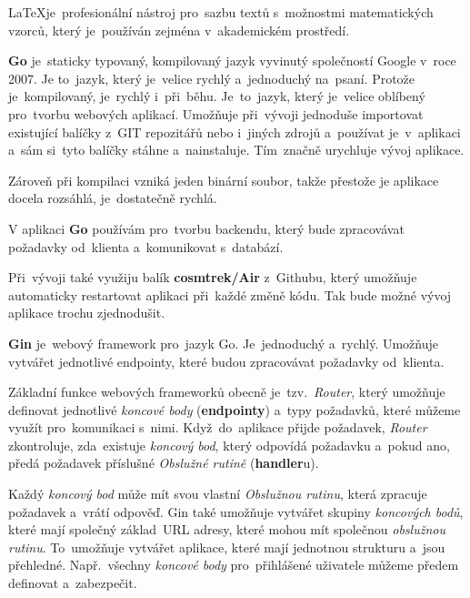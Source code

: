 \documentclass[14pt]{article}
\begin{document}
            \LaTeX je~profesionální nástroj pro~sazbu textů s~možnostmi matematických vzorců, který je~používán zejména v~akademickém prostředí.\parencite{Rybicka2003:latex}

            \textbf{Go} je~staticky typovaný, kompilovaný jazyk vyvinutý společností Google v~roce 2007. Je to~jazyk, který je~velice rychlý a~jednoduchý na~psaní.
            Protože je~kompilovaný, je~rychlý i~při~běhu. Je~to~jazyk, který je~velice oblíbený pro~tvorbu webových aplikací.
            Umožňuje při~vývoji jednoduše importovat existující balíčky z~GIT repozitářů nebo i~jiných zdrojů a~používat je~v~aplikaci a~sám
            si~tyto balíčky stáhne a~nainstaluje. Tím~značně urychluje vývoj aplikace.

            Zároveň při kompilaci vzniká jeden binární soubor, takže přestože je aplikace docela rozsáhlá, je~dostatečně rychlá.
            
            V aplikaci \textbf{Go} používám pro~tvorbu backendu, který bude zpracovávat požadavky od~klienta a~komunikovat s~databází.

            Při~vývoji také využiju balík \textbf{cosmtrek/Air} z~Githubu, který umožňuje automaticky restartovat aplikaci při~každé změně kódu.
            Tak bude možné vývoj aplikace trochu zjednodušit.

            \textbf{Gin} je~webový framework pro~jazyk Go. Je~jednoduchý a~rychlý. Umožňuje vytvářet jednotlivé endpointy,
            které budou zpracovávat požadavky od~klienta.

            Základní funkce webových frameworků obecně je~tzv.~\emph{Router}, který umožňuje definovat jednotlivé \emph{koncové body} (\textbf{endpointy}) a~typy požadavků, které můžeme využít pro~komunikaci s~nimi.
            Když~do~aplikace přijde požadavek, \emph{Router} zkontroluje, zda~existuje \emph{koncový bod}, který odpovídá požadavku a~pokud ano, předá požadavek příslušné \emph{Obslužné rutině} (\textbf{handler}u).

            Každý \emph{koncový bod} může mít svou vlastní \emph{Obslužnou rutinu}, která zpracuje požadavek a~vrátí odpověď.
            Gin také umožňuje vytvářet skupiny \emph{koncových bodů}, které mají společný základ~URL adresy, které mohou mít společnou \emph{obslužnou rutinu}.
            To~umožňuje vytvářet aplikace, které mají jednotnou strukturu a~jsou přehledné. Např.~všechny \emph{koncové body} pro~přihlášené
            uživatele můžeme předem definovat a~zabezpečit.
            
\end{document}
